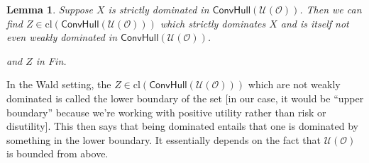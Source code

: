 \documentclass[a4paper]{article}
\newtheorem{lemma}[theorem]{Lemma}
\newcommand\cl{\mathrm{cl}}
\renewcommand\O{\mathcal{O}}
\newcommand\Uwald{\mathcal{U}} %
\newcommand{\Conv}{\mathsf{ConvHull}}
\newenvironment{CCM rewritten}
{\begingroup\color{blue}} %
{\endgroup}              %
\begin{document}
	\begin{lemma}\label{thm:cct:dominator on boundry}
		Suppose $X$ is strictly  dominated in $\Conv(\Uwald(\O))$. Then we can find $Z\in\cl(\Conv(\Uwald(\O)))$ which strictly dominates $X$ and is itself not even weakly dominated in $\Conv(\Uwald(\O))$. \begin{infversion}
			and $Z$ in Fin.
		\end{infversion}
	\end{lemma}
	In the Wald setting, the $Z\in\cl(\Conv(\Uwald(\O)))$ which are not weakly dominated is called the lower boundary of the set [in our case, it would be ``upper boundary'' because we're working with positive utility rather than risk or disutility]. This then says that being dominated entails that one is dominated by something in the lower boundary. It essentially depends on the fact that $\Uwald(\O)$ is bounded from above. 
	
\end{document}
